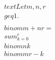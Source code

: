\documentclass[preview]{standalone}
\begin{document}
\begin{align*}
\quad\\text{Let } m, n, r \quad\\geq 1. \quad\\ \quad\\binom{m+n}{r} = \quad\\sum_{k=0}^r \quad\\binom{n}{k} \quad\\binom{m}{r-k}
\end{align*}
\end{document}
